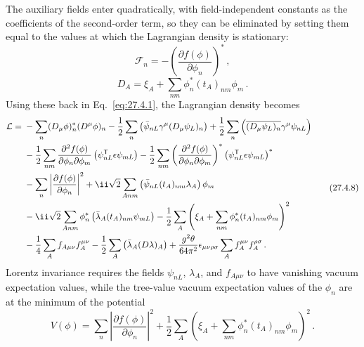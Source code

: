 The auxiliary fields enter quadratically, with field-independent constants as
the coefficients of the second-order term, so they can be eliminated by
setting them equal to the values at which the Lagrangian density is
stationary:
\begin{equation}
  \mathcal{F}_n
  =-\left(\frac{\partial f(\phi)}{\partial\phi_n}\right)^*\,,
  \tag{27.4.6}\label{eq:27.4.6}
\end{equation}
\begin{equation}
  D_A=\xi_A+\sum_{nm}\phi_n^*(t_A)_{nm}\phi_m\,.
  \tag{27.4.7}\label{eq:27.4.7}
\end{equation}
Using these back in Eq.~\eqref{eq:27.4.1}, the Lagrangian density becomes
\begin{equation}
  \begin{aligned}
  \mathcal{L}={}&
  -\sum_n(D_\mu\phi)_n^*(D^\mu\phi)_n
  -\frac12\sum_n
    \left(\bar\psi_{nL}\gamma^\mu(D_\mu\psi_L)_n\right)
  +\frac12\sum_n
    \left(\overline{(D_\mu\psi_L)_n}\gamma^\mu\psi_{nL}\right)
  \\
  &-\frac12\sum_{nm}
    \frac{\partial^2f(\phi)}{\partial\phi_n\partial\phi_m}
    \left(\psi_{nL}^{\mathsf T}\epsilon\psi_{mL}\right)
  -\frac12\sum_{nm}
    \left(
      \frac{\partial^2f(\phi)}{\partial\phi_n\partial\phi_m}
    \right)^*
    \left(\psi_{nL}^{\mathsf T}\epsilon\psi_{mL}\right)^*
  \\
  &-\sum_n\left|
    \frac{\partial f(\phi)}{\partial\phi_n}
  \right|^2
  +\ii\sqrt{2}\sum_{Anm}
    \left(\bar\psi_{nL}(t_A)_{nm}\lambda_A\right)\phi_m
  \\
  &-\ii\sqrt{2}\sum_{Anm}
    \phi_n^*\left(\bar\lambda_A(t_A)_{nm}\psi_{mL}\right)
  -\frac12\sum_A
    \left(\xi_A+\sum_{nm}\phi_n^*(t_A)_{nm}\phi_m\right)^2
  \\
  &-\frac14\sum_Af_{A\mu\nu}f_A^{\mu\nu}
  -\frac12\sum_A\left(\bar\lambda_A(\sl{D}\lambda)_A\right)
  +\frac{g^2\theta}{64\pi^2}\epsilon_{\mu\nu\rho\sigma}
    \sum_Af_A^{\mu\nu}f_A^{\rho\sigma}\,.
  \end{aligned}
  \tag{27.4.8}\label{eq:27.4.8}
\end{equation}
Lorentz invariance requires the fields \(\psi_{nL}\), \(\lambda_A\), and
\(f_{A\mu\nu}\) to have vanishing vacuum expectation values, while the
tree-value vacuum expectation values of the \(\phi_n\) are at the minimum of
the potential
\begin{equation}
  V(\phi)
  =\sum_n\left|\frac{\partial f(\phi)}{\partial\phi_n}\right|^2
  +\frac12\sum_A
    \left(\xi_A+\sum_{nm}\phi_n^*(t_A)_{nm}\phi_m\right)^2\,.
  \tag{27.4.9}\label{eq:27.4.9}
\end{equation}
